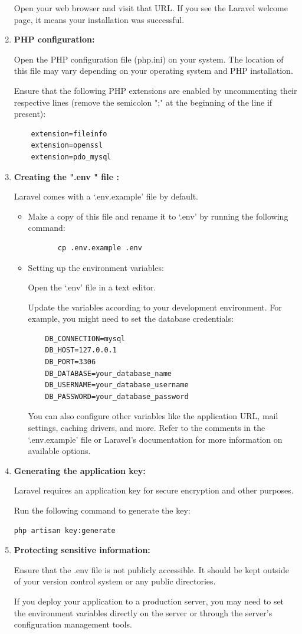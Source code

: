 \begin{enumerate}
  Open your web browser and visit that URL. If you see the Laravel welcome page, it means your installation was successful. 
  \item \textbf{PHP configuration:}
  
  Open the PHP configuration file (php.ini) on your system. The location of this file may vary depending on your operating system and PHP installation.
 
  Ensure that the following PHP extensions are enabled by uncommenting their respective lines (remove the semicolon ";" at the beginning of the line if present):
 \begin{verbatim}
    extension=fileinfo
    extension=openssl
    extension=pdo_mysql
 \end{verbatim}
 \newpage
 \item \textbf{Creating the ".env " file :}

 Laravel comes with a `.env.example' file by default. 
 \begin{itemize}
    \item 
    Make a copy of this file and rename it to `.env' by running the following command:
    \begin{verbatim}
       cp .env.example .env 
    \end{verbatim}
    \item Setting up the environment variables:
     
    Open the `.env' file in a text editor.

    Update the variables according to your development environment. For example, you might need to set the database credentials:
\begin{verbatim}
    DB_CONNECTION=mysql
    DB_HOST=127.0.0.1
    DB_PORT=3306
    DB_DATABASE=your_database_name
    DB_USERNAME=your_database_username
    DB_PASSWORD=your_database_password
\end{verbatim}

You can also configure other variables like the application URL, mail settings, caching drivers, and more. Refer to the comments in the `.env.example' file or Laravel's documentation for more information on available options.
\end{itemize}
\item \textbf{Generating the application key: }

Laravel requires an application key for secure encryption and other purposes. 

Run the following command to generate the key:
\begin{verbatim}
php artisan key:generate
\end{verbatim}
\item \textbf{Protecting sensitive information:}

   Ensure that the .env file is not publicly accessible. It should be kept outside of your version control system or any public directories.
    
   If you deploy your application to a production server, you may need to set the environment variables directly on the server or through the server's configuration management tools.
 \end{enumerate}
